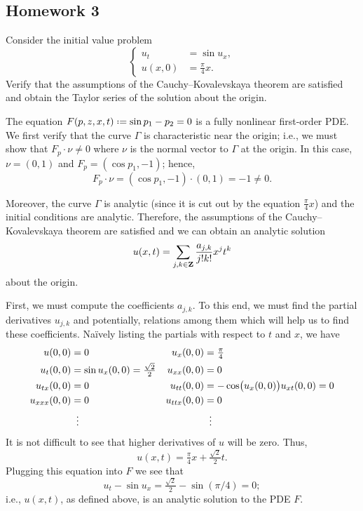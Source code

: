 \subsection{Homework 3}
\begin{problem}
  Consider the initial value problem
  \[
    \left\{
      \begin{aligned}
        u_t&=\sin u_x,\\
        u(x,0)&=\tfrac{\pi}{4}x.
      \end{aligned}
    \right.
  \]
  Verify that the assumptions of the Cauchy--Kovalevskaya theorem are
  satisfied and obtain the Taylor series of the solution about the origin.
\end{problem}
\begin{solution*}
  The equation \(F(p,z,x,t)\defeq\sin p_1-p_2=0\) is a fully nonlinear
  first-order PDE. We first verify that the curve \(\Gamma\) is
  characteristic near the origin; i.e., we must show that \(F_p\cdot\nu\neq
  0\) where \(\nu\) is the normal vector to \(\Gamma\) at the origin. In
  this case, \(\nu=(0,1)\) and \(F_p=(\cos p_1,-1)\); hence,
  \[
    F_p\cdot\nu= (\cos p_1,-1)\cdot(0,1)=-1\neq 0.
  \]

  Moreover, the curve \(\Gamma\) is analytic (since it is cut out by the
  equation \(\frac{\pi}{4}x\)) and the initial conditions are
  analytic. Therefore, the assumptions of the Cauchy--Kovalevskaya theorem
  are satisfied and we can obtain an analytic solution
  \[
    u(x,t)=\sum_{j,k\in\mathbf{Z}}\frac{a_{j,k}}{j!k!}x^jt^k
  \]
  about the origin.

  First, we must compute the coefficients \(a_{j,k}\). To this end, we must
  find the partial derivatives \(u_{j,k}\) and potentially, relations among
  them which will help us to find these coefficients. Naïvely listing the
  partials with respect to \(t\) and \(x\), we have
  \begin{align*}
    u(0,0)&=0&
    u_x(0,0)&=\tfrac{\pi}{4}\\
    u_t(0,0)&=\sin u_x(0,0)=\tfrac{\sqrt{2}}{2}&
    u_{xx}(0,0)&=0\\
    u_{tx}(0,0)&=0&
    u_{tt}(0,0)&=-\cos\bigl(u_x(0,0)\bigr)u_{xt}(0,0)=0\\
    u_{xxx}(0,0)&=0&
    u_{ttx}(0,0)&=0\\
    &\vdotswithin{=}&&\vdotswithin{=}
  \end{align*}
  It is not difficult to see that higher derivatives of \(u\) will be
  zero. Thus,
  \[
    u(x,t)=\tfrac{\pi}{4}x+\tfrac{\sqrt{2}}{2}t.
  \]
  Plugging this equation into \(F\) we see that
  \[
    u_t-\sin u_x=\tfrac{\sqrt{2}}{2}-\sin(\pi/4)=0;
  \]
  i.e., \(u(x,t)\), as defined above, is an analytic solution to the PDE
  \(F\).
\end{solution*}

